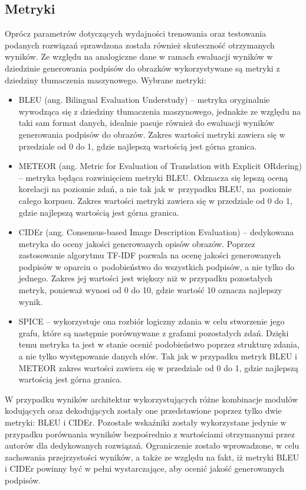 \subsection{Metryki}
Oprócz parametrów dotyczących wydajności trenowania oraz testowania podanych rozwiązań sprawdzona została również skuteczność otrzymanych wyników. Ze względu na analogiczne dane w ramach ewaluacji wyników w dziedzinie generowania podpisów do obrazków wykorzystywane są metryki z dziedziny tłumaczenia maszynowego. Wybrane metryki:
\begin{itemize}
    \item BLEU (ang. Bilingual Evaluation Understudy) \cite{bleu} -- metryka oryginalnie wywodząca się z dziedziny tłumaczenia maszynowego, jednakże ze względu na taki sam format danych, idealnie pasuje również do ewaluacji wyników generowania podpisów do obrazów. Zakres wartości metryki zawiera się w przedziale od 0 do 1, gdzie najlepszą wartością jest górna granica. %
    \item METEOR (ang. Metric for Evaluation of Translation with Explicit ORdering) \cite{meteor} -- metryka będąca rozwinięciem metryki BLEU. Odznacza się lepszą oceną korelacji na poziomie zdań, a nie tak jak w~przypadku BLEU, na~poziomie całego korpusu. Zakres wartości metryki zawiera się w przedziale od 0 do 1, gdzie najlepszą wartością jest górna granica.
    \item CIDEr (ang. Consensus-based Image Description Evaluation) \cite{cider} -- dedykowana metryka do oceny jakości generowanych opisów obrazów. Poprzez zastosowanie algorytmu TF-IDF \cite{tfidf} pozwala na ocenę jakości generowanych podpisów w oparciu o~podobieństwo do wszystkich podpisów, a nie tylko do jednego. Zakres jej wartości jest większy niż w przypadku pozostałych metryk, ponieważ wynosi od 0 do 10, gdzie wartość 10 oznacza najlepszy wynik.
    \item SPICE -- wykorzystuje ona rozbiór logiczny zdania w celu stworzenie jego grafu, które są następnie porównywane z grafami pozostałych zdań. Dzięki temu metryka ta jest w stanie ocenić podobieństwo poprzez strukturę zdania, a nie tylko występowanie danych słów. Tak jak w przypadku metryk BLEU i METEOR zakres wartości zawiera się w przedziale od 0 do 1, gdzie najlepszą wartością jest górna granica.
\end{itemize}
W przypadku wyników architektur wykorzystujących różne kombinacje modułów kodujących oraz dekodujących zostały one przedstawione poprzez tylko dwie metryki: BLEU i CIDEr. Pozostałe wskaźniki zostały wykorzystane jedynie w przypadku porównania wyników bezpośrednio z wartościami otrzymanymi przez autorów dla dedykowanych rozwiązań. Ograniczenie zostało wprowadzone, w celu zachowania przejrzystości wyników, a także ze względu na fakt, iż metryki BLEU i CIDEr powinny być w pełni wystarczające, aby ocenić jakość generowanych podpisów.
